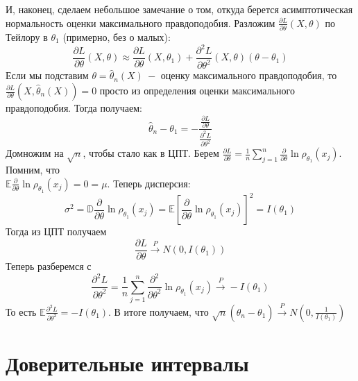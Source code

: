 \begin{remark}
И, наконец, сделаем небольшое замечание о том, откуда берется асимптотическая нормальность оценки максимального правдоподобия. Разложим $\frac{\partial L}{\partial \theta}\left(X, \theta\right)$ по Тейлору в $\theta_1$ (примерно, без о малых):
\[
    \frac{\partial L}{\partial \theta}\left(X, \theta\right) \approx \frac{\partial L}{\partial \theta}\left(X, \theta_1\right) + \frac{\partial ^ 2 L}{\partial \theta ^ 2}\left(X, \theta\right)\left(\theta - \theta_1\right)
\]
Если мы подставим $\theta = \widehat{\theta}_n\left(X\right) \ - $ оценку максимального правдоподобия, то $\frac{\partial L}{\partial \theta}\left(X, \widehat{\theta}_n\left(X\right)\right) = 0$ просто из определения оценки максимального правдоподобия. Тогда получаем:
\[
    \widehat{\theta}_n - \theta_1 = -\frac{\frac{\partial L}{\partial \theta}}{\frac{\partial ^ 2 L}{\partial \theta ^ 2}}
\]
Домножим на $\sqrt{n}$, чтобы стало как в ЦПТ. Берем $\frac{\partial L}{\partial \theta} = \frac 1 n \sum_{j = 1}^{n} \frac{\partial}{\partial \theta} \ln \rho_{\theta_1}\left(x_j\right)$. Помним, что \\ $\mathbb{E} \frac{\partial}{\partial \theta} \ln \rho_{\theta_1}\left(x_j\right) = 0 = \mu$. Теперь дисперсия: 
\[\sigma ^ 2 = \mathbb{D} \frac{\partial}{\partial \theta} \ln \rho_{\theta_1}\left(x_j\right) = \mathbb{E} \left[\frac{\partial}{\partial \theta} \ln \rho_{\theta_1}\left(x_j\right)\right] ^ 2 = I\left(\theta_1\right)
\]
Тогда из ЦПТ получаем
\[
    \frac{\partial L}{\partial \theta} \xrightarrow{P} N\left(0, I\left(\theta_1\right)\right)
\]
Теперь разберемся с 
\[
    \frac{\partial ^ 2 L}{\partial \theta ^ 2} = \frac 1 n \sum_{j = 1}^{n} \frac{\partial ^ 2}{\partial \theta ^ 2} \ln \rho_{\theta_1}\left(x_j\right) \xrightarrow{P} -I\left(\theta_1\right)
\]
То есть $\mathbb{E}\frac{\partial ^ 2 L}{\partial \theta ^ 2} = -I\left(\theta_1\right)$. В итоге получаем, что $\sqrt{n}\left(\widehat{\theta}_n - \theta_1\right) \xrightarrow{P} N\left(0, \frac 1 {I\left(\theta_1\right)}\right)$
\end{remark}

\clearpage

\section{Доверительные интервалы}

